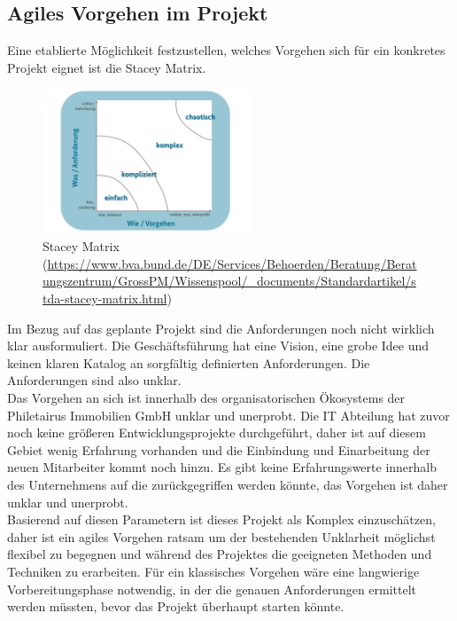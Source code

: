 \subsection{Agiles Vorgehen im Projekt}
\label{subsec:agilesVorgehen}

Eine etablierte Möglichkeit festzustellen, welches Vorgehen sich für ein konkretes Projekt eignet ist die Stacey Matrix.\\

\begin{figure}[!h]
\centering
\includegraphics[width=6.24cm, height=4.32cm]{StaceyMatrix}
\caption{Stacey Matrix (\url{https://www.bva.bund.de/DE/Services/Behoerden/Beratung/Beratungszentrum/GrossPM/Wissenspool/_documents/Standardartikel/stda-stacey-matrix.html})}
\end{figure}

Im Bezug auf das geplante Projekt sind die Anforderungen noch nicht wirklich klar ausformuliert. Die Geschäftsführung hat eine Vision, eine grobe Idee und keinen klaren Katalog an sorgfältig definierten Anforderungen. Die Anforderungen sind also unklar.\\

Das Vorgehen an sich ist innerhalb des organisatorischen Ökosystems der Philetairus Immobilien GmbH unklar und unerprobt. Die IT Abteilung hat zuvor noch keine größeren Entwicklungsprojekte durchgeführt, daher ist auf diesem Gebiet wenig Erfahrung vorhanden und die Einbindung und  Einarbeitung der neuen Mitarbeiter kommt noch hinzu. Es gibt keine Erfahrungswerte innerhalb des Unternehmens auf die zurückgegriffen werden könnte, das Vorgehen ist daher unklar und unerprobt.\\

Basierend auf diesen Parametern ist dieses Projekt als Komplex einzuschätzen, daher ist ein agiles Vorgehen ratsam um der bestehenden Unklarheit möglichst flexibel zu begegnen und während des Projektes die geeigneten Methoden und Techniken zu erarbeiten. Für ein klassisches Vorgehen wäre eine langwierige Vorbereitungsphase notwendig, in der die genauen Anforderungen ermittelt werden müssten, bevor das Projekt überhaupt starten könnte.\\


